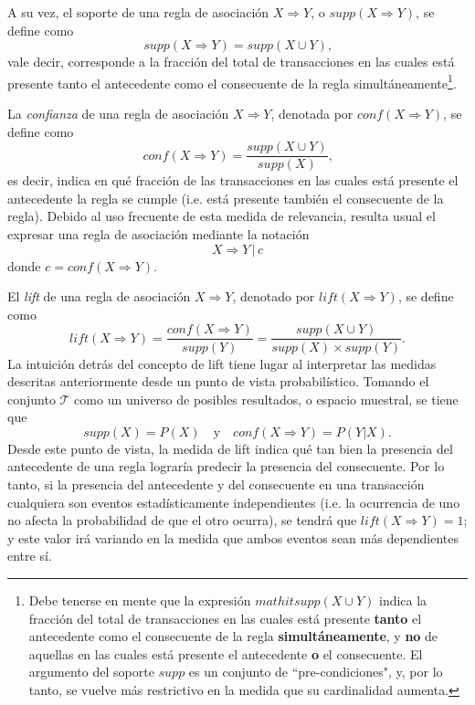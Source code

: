 A su vez, el soporte de una regla de asociación $X \Rightarrow Y$, o $\mathit{supp}(X \Rightarrow Y)$, se define como $$\mathit{supp}(X \Rightarrow Y) = \mathit{supp}(X \cup Y)\text{,}$$ vale decir, corresponde a la fracción del total de transacciones en las cuales está presente tanto el antecedente como el consecuente de la regla simultáneamente\footnote{Debe tenerse en mente que la expresión $mathit{supp}(X \cup Y)$ indica la fracción del total de transacciones en las cuales está presente \textbf{tanto} el antecedente como el consecuente de la regla \textbf{simultáneamente}, y \textbf{no} de aquellas en las cuales está presente el antecedente \textbf{o} el consecuente. El argumento del soporte $\mathit{supp}$ es un conjunto de ``pre-condiciones", y, por lo tanto, se vuelve más restrictivo en la medida que su cardinalidad aumenta.}.

La \textit{confianza} de una regla de asociación $X \Rightarrow Y$, denotada por $\mathit{conf}(X \Rightarrow Y)$, se define como $$\mathit{conf}(X \Rightarrow Y) = \frac{\mathit{supp}(X \cup Y)}{\mathit{supp}(X)}\text{,}$$ es decir, indica en qué fracción de las transacciones en las cuales está presente el antecedente la regla se cumple (i.e. está presente también el consecuente de la regla). Debido al uso frecuente de esta medida de relevancia, resulta usual el expresar una regla de asociación mediante la notación $$X \Rightarrow Y \, \Big| \, c$$ donde $c = \mathit{conf}(X \Rightarrow Y)$.

El \textit{lift} de una regla de asociación $X \Rightarrow Y$, denotado por $\mathit{lift}(X \Rightarrow Y)$, se define como $$\mathit{lift}(X \Rightarrow Y) = \frac{\mathit{conf}(X \Rightarrow Y)}{\mathit{supp}(Y)} = \frac{\mathit{supp}(X \cup Y)}{\mathit{supp}(X) \times \mathit{supp}(Y)}\text{.}$$ La intuición detrás del concepto de lift tiene lugar al interpretar las medidas descritas anteriormente desde un punto de vista probabilístico. Tomando el conjunto $\mathcal{T}$ como un universo de posibles resultados, o espacio muestral, se tiene que $$\mathit{supp}(X) = P(X) \quad \text{y} \quad \mathit{conf}(X \Rightarrow Y) = P(Y| X)\text{.}$$ Desde este punto de vista, la medida de lift indica qué tan bien la presencia del antecedente de una regla lograría predecir la presencia del consecuente. Por lo tanto, si la presencia del antecedente y del consecuente en una transacción cualquiera son eventos estadísticamente independientes (i.e. la ocurrencia de uno no afecta la probabilidad de que el otro ocurra), se tendrá que $\mathit{lift}(X \Rightarrow Y) = 1$; y este valor irá variando en la medida que ambos eventos sean más dependientes entre sí.

